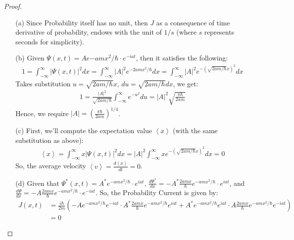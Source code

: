 \documentclass{article}
\begin{document}
\begin{proof}
    
    \hfil

    \begin{itemize}
        \item[(a)] Since Probability itself has no unit, then $J$ as a consequence of time derivative of probability, endows with the unit of $1/s$ (where $s$ represents seconds for simplicity).
        \item[(b)] Given $\Psi(x,t)=Ae{-amx^2/\hbar}\cdot e^{-iat}$, then it satisfies the following:
        \begin{align}
            1=\int_{-\infty}^{\infty}|\Psi(x,t)|^2 dx = \int_{-\infty}^{\infty}|A|^2e^{-2amx^2/\hbar}dx = \int_{-\infty}^{\infty}|A|^2e^{-\left(\sqrt{2am/\hbar}x\right)^2}dx
        \end{align}
        Takes substitution $u=\sqrt{2am/\hbar}x$, $du=\sqrt{2am/\hbar}dx$, we get:
        \begin{align}
            1=\frac{|A|^2}{\sqrt{2am/\hbar}}\int_{-\infty}^{\infty}e^{-u^2}du = |A|^2\sqrt{\frac{\pi\hbar}{2am}}
        \end{align}
        Hence, we require $|A|=\left(\frac{\pi\hbar}{2am}\right)^{1/4}$.
        \item[(c)] First, we'll compute the expectation value $\left<x\right>$ (with the same substitution as above):
        \begin{align}
            \left<x\right>=\int_{-\infty}^{\infty}x|\Psi(x,t)|^2dx = |A|^2\int_{-\infty}^{\infty}xe^{-(\sqrt{2am/\hbar}x)^2}dx = 0
        \end{align}
        So, the average velocity $\left<v\right>=\frac{d\left<x\right>}{dt}=0$.
        \item[(d)] Given that $\Psi^*(x,t)=A^*e^{-amx^2/\hbar}\cdot e^{iat}$, $\frac{d\Psi^*}{dx}=-A^*\frac{2amx}{\hbar}e^{-amx^2/\hbar}\cdot e^{iat}$, and $\frac{d\Psi}{dx}=-A\frac{2amx}{\hbar}e^{-amx^2/\hbar}\cdot e^{-iat}$. So, the Probability Current is given by:
        \begin{align}
            J(x,t) &= \frac{i\hbar}{2m}\left(-Ae^{-amx^2/\hbar}e^{-iat}\cdot A^*\frac{2amx}{\hbar}e^{-amx^2/\hbar} e^{iat}+A^*e^{-amx^2/\hbar}e^{iat}\cdot A\frac{2amx}{\hbar}e^{-amx^2/\hbar}e^{-iat}\right)\\
            &=0
        \end{align}
    \end{itemize}
\end{proof}
\end{document}
